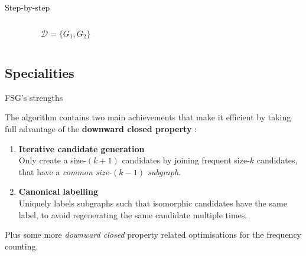 \documentclass[10pt, aspectratio=149]{beamer}
\begin{document}
\begin{frame}{Step-by-step}
\begin{columns}[T]
{\begin{itemize}
\end{itemize}

}

\begin{figure}
  \centering
  \caption{$\mathcal{D} = \{G_1, G_2\}$}
\end{figure}

\end{columns}
\end{frame}


\subsection{Specialities}

\begin{frame}{FSG's strengths}

The algorithm contains two main achievements  that make it efficient by
taking full advantage of the \textbf{downward closed property} \cite{FSG}:

\begin{enumerate}
    \item \textbf{Iterative candidate generation} \\ 
    Only create a size-$(k + 1)$ candidates by joining frequent size-$k$ candidates, that have a \textit{common size-$(k-1)$ subgraph}.
    
    \item \textbf{Canonical labelling} \\ 
    Uniquely labels subgraphs such that isomorphic candidates have the same label, to avoid regenerating the same candidate multiple times.
\end{enumerate}

Plus some more \textit{downward closed} property related optimisations for the frequency counting.
\end{frame}
\end{document}
